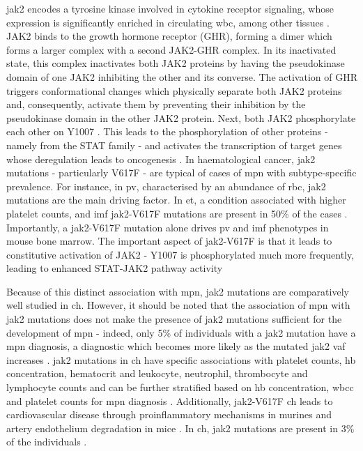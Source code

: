 \Ac{jak2} encodes a tyrosine kinase involved in cytokine receptor signaling, whose expression is significantly enriched in circulating \ac{wbc}, among other tissues \cite{Saltzman1998-wi}. JAK2 binds to the growth hormone receptor (GHR), forming a dimer which forms a larger complex with a second JAK2-GHR complex. In its inactivated state, this complex inactivates both JAK2 proteins by having the pseudokinase domain of one JAK2 inhibiting the other and its converse. The activation of GHR triggers conformational changes which physically separate both JAK2 proteins and, consequently, activate them by preventing their inhibition by the pseudokinase domain in the other JAK2 protein. Next, both JAK2 phosphorylate each other on Y1007 \cite{Brooks2014-fh}. This leads to the phosphorylation of other proteins - namely from the STAT family - and activates the transcription of target genes whose deregulation leads to oncogenesis \cite{Brooks2010-dc}. In haematological cancer, \ac{jak2} mutations - particularly V617F - are typical of cases of \ac{mpn} with subtype-specific prevalence. For instance, in \ac{pv}, characterised by an abundance of \ac{rbc}, \ac{jak2} mutations are the main driving factor. In \ac{et}, a condition associated with higher platelet counts, and \ac{imf} \ac{jak2}-V617F mutations are present in 50\% of the cases \cite{Constantinescu2008-cf}. Importantly, a \ac{jak2}-V617F mutation alone drives \ac{pv} and \ac{imf} phenotypes in mouse bone marrow. The important aspect of \ac{jak2}-V617F is that it leads to constitutive activation of JAK2 - Y1007 is phosphorylated much more frequently, leading to enhanced STAT-JAK2 pathway activity \cite{Feng1997-jr,Constantinescu2008-cf}

Because of this distinct association with \ac{mpn}, \ac{jak2} mutations are comparatively well studied in \ac{ch}. However, it should be noted that the association of \ac{mpn} with \ac{jak2} mutations does not make the presence of \ac{jak2} mutations sufficient for the development of \ac{mpn} - indeed, only 5\% of individuals with a \ac{jak2} mutation have a \ac{mpn} diagnosis, a diagnostic which becomes more likely as the mutated \ac{jak2} \ac{vaf} increases \cite{Cordua2019-mo}. \ac{jak2} mutations in \ac{ch} have specific associations with platelet counts, \ac{hb} concentration, hematocrit and leukocyte, neutrophil, thrombocyte and lymphocyte counts \cite{Dawoud2020-af,Cordua2019-mo} and can be further stratified based on \ac{hb} concentration, \ac{wbcc} and platelet counts for \ac{mpn} diagnosis \cite{Sochacki2019-mu,Dawoud2020-af}. Additionally, \ac{jak2}-V617F \ac{ch} leads to cardiovascular disease through proinflammatory mechanisms in murines and artery endothelium degradation in mice \cite{Sano2019-hm,Molinaro_Roberto2020-hd}. In \ac{ch}, \ac{jak2} mutations are present in 3\% of the individuals \cite{Cordua2019-mo}.

